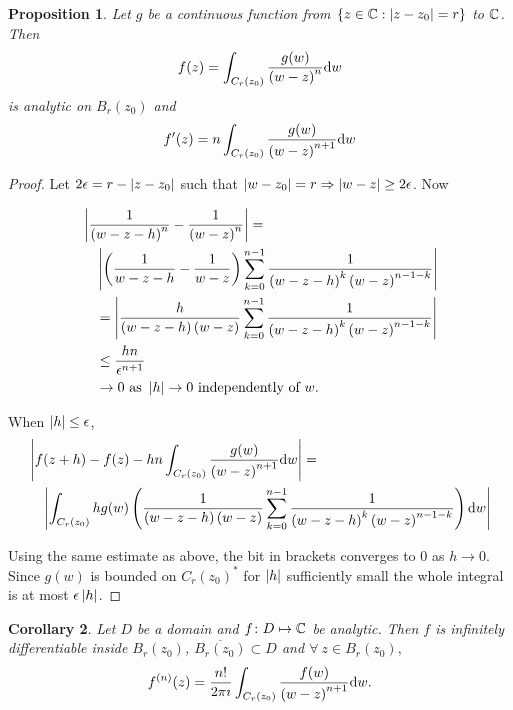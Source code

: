 \documentclass{notes}
\theoremstyle{plain}
\newtheorem{proposition}{Proposition}[chapter]
\newtheorem{corollary}[proposition]{Corollary}
\begin{document}
\begin{proposition}
Let $g$ be a continuous function from $\{ z \in \mathbb{C} : \left|z - z_0\right| = r \}$ to
$\mathbb{C}$.  Then
\[
f(z) = \int_{C_r(z_0)} \frac{g(w)}{\left( w - z \right)^n} \mathrm{d} w
\]
is analytic on $B_r(z_0)$ and
\[
f'(z) = n \int_{C_r(z_0)} \frac{g(w)}{\left( w - z \right)^{n+1}} \mathrm{d} w
\]
\end{proposition}

\begin{proof}
Let $2 \epsilon = r - \left|z - z_0\right|$ such that $\left|w - z_0\right| = r
\Rightarrow \left|w - z\right| \ge 2 \epsilon$.  Now

\begin{align*}
&\left| \frac{1}{\left( w - z -h \right)^n} - \frac{1}{\left( w - z \right)^n}\right|
= \\
&\quad \left| \left( \frac{1}{w-z-h} - \frac{1}{w-z} \right)
\sum_{k=0}^{n-1} \frac{1}{\left(w-z-h\right)^k \left(w-z\right)^{n-1-k}} \right| \\
& \quad =
\left| \frac{h}{\left(w-z-h\right) \left(w-z \right)}
\sum_{k=0}^{n-1} \frac{1}{\left(w-z-h\right)^k \left(w-z\right)^{n-1-k}} \right| \\
&\quad \le \frac{h n}{\epsilon^{n+1}} \\
&\quad \rightarrow 0 \text{ as } \left|h\right| \rightarrow 0 \text{ independently of } w.
\end{align*}

When $\left|h\right| \le \epsilon$,
\begin{align*}
& \left|f(z+h)  - f(z) - h n \int_{C_r(z_0)} \frac{g(w)}{\left( w-z \right)^{n+1}}
\mathrm{d} w\right|
= \\ 
&\quad \left|
\int_{C_r(z_0)} h g(w) \left(
\frac{1}{\left(w-z-h\right) \left(w-z \right)}
\sum_{k=0}^{n-1} \frac{1}{\left(w-z-h\right)^k \left(w-z\right)^{n-1-k}}
\right) \mathrm{d} w\right|
\end{align*}

Using the same estimate as above, the bit in brackets converges to $0$
as $h \rightarrow 0$.  Since $g(w)$ is bounded on $C_r(z_0)^*$ for
$\left|h\right|$ sufficiently small the whole integral is at most $\epsilon \left|h\right|$.
\end{proof}

\begin{corollary}
Let $D$ be a domain and $f \colon D \mapsto \mathbb{C}$ be analytic.  Then $f$ is
infinitely differentiable inside $B_r(z_0)$, $\overline{B_r(z_0)} \subset D$
and $\forall\ z \in B_r(z_0),$
\[
f^{(n)}(z) = \frac{n!}{2 \pi \imath} \int_{C_r(z_0)} \frac{f(w)}{\left(
w-z \right)^{n+1}} \mathrm{d} w.
\]
\end{corollary}
\end{document}
